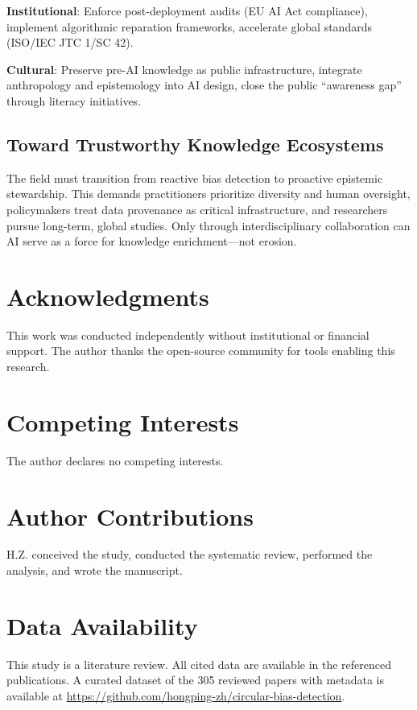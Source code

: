 \documentclass[11pt]{article}
\begin{document}
\textbf{Institutional}: Enforce post-deployment audits (EU AI Act compliance\cite{european2021}), implement algorithmic reparation frameworks\cite{wyllie2024}, accelerate global standards (ISO/IEC JTC 1/SC 42\cite{iso2023}).

\textbf{Cultural}: Preserve pre-AI knowledge as public infrastructure, integrate anthropology and epistemology into AI design, close the public ``awareness gap''\cite{glickman2024} through literacy initiatives.

\subsection{Toward Trustworthy Knowledge Ecosystems}

The field must transition from reactive bias detection to proactive epistemic stewardship. This demands practitioners prioritize diversity and human oversight, policymakers treat data provenance as critical infrastructure, and researchers pursue long-term, global studies. Only through interdisciplinary collaboration can AI serve as a force for knowledge enrichment—not erosion.

\section*{Acknowledgments}
This work was conducted independently without institutional or financial support. The author thanks the open-source community for tools enabling this research.

\section*{Competing Interests}
The author declares no competing interests.

\section*{Author Contributions}
H.Z. conceived the study, conducted the systematic review, performed the analysis, and wrote the manuscript.

\section*{Data Availability}
This study is a literature review. All cited data are available in the referenced publications. A curated dataset of the 305 reviewed papers with metadata is available at \url{https://github.com/hongping-zh/circular-bias-detection}.
\end{document}

